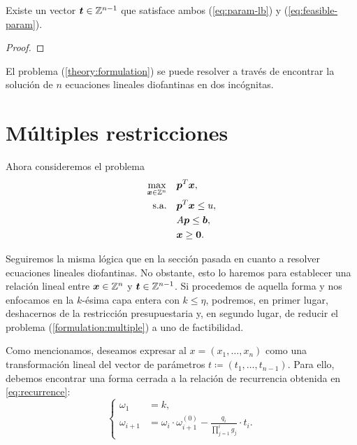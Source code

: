 \begin{lemma}
	Existe un vector $\boldsymbol{t} \in \mathbb{Z}^{n-1}$ que satisface ambos (\ref{eq:param-lb}) y
	(\ref{eq:feasible-param}).
\end{lemma}
\begin{proof}
\end{proof}

\begin{theorem}
	El problema (\ref{theory:formulation}) se puede resolver a través de encontrar la solución de
	$n$ ecuaciones lineales diofantinas en dos incógnitas.
\end{theorem}

\section{Múltiples restricciones}
\noindent
Ahora consideremos el problema
\begin{subequations}
	\label{formulation:multiple}
	\begin{align}
		\max_{\boldsymbol{x} \in \mathbb{Z}^n} \quad
			& \boldsymbol{p}^T\boldsymbol{x}, \label{formulation:multiple:objective} \\
		\text{s.a.} \quad
			& \boldsymbol{p}^T\boldsymbol{x} \leq u, \label{formulation:multiple:constraint:budget} \\
			& A\boldsymbol{p} \leq \boldsymbol{b}, \label{formulation:multiple:constraints} \\
			& \boldsymbol{x} \geq \boldsymbol{0}. \nonumber
	\end{align}
\end{subequations}

Seguiremos la misma lógica que en la sección pasada en cuanto a resolver ecuaciones lineales
diofantinas. No obstante, esto lo haremos para establecer una relación lineal entre $\boldsymbol{x} \in
\mathbb{Z}^n$ y $\boldsymbol{t} \in \mathbb{Z}^{n-1}$. Si procedemos de aquella forma y nos enfocamos en la $k$-ésima capa
entera con $k \leq \eta$, podremos, en primer lugar, deshacernos de la restricción presupuestaria y,
en segundo lugar, de reducir el problema (\ref{formulation:multiple}) a uno de factibilidad.

Como mencionamos, deseamos expresar al $x = (x_1, \ldots, x_n)$ como una transformación lineal del
vector de parámetros $t \coloneq (t_1, \ldots, t_{n-1})$. Para ello, debemos encontrar una forma
cerrada a la relación de recurrencia obtenida en \ref{eq:recurrence}:
\begin{equation}
	\label{eq:omega-recurrence}
	\begin{cases}
		\omega_1 &= k, \\
		\omega_{i + 1} &= \omega_i \cdot \omega_{i + 1}^{(0)} - \frac{q_i}{\prod_{j=1}^{i}g_j} \cdot t_i.
	\end{cases}
\end{equation}

